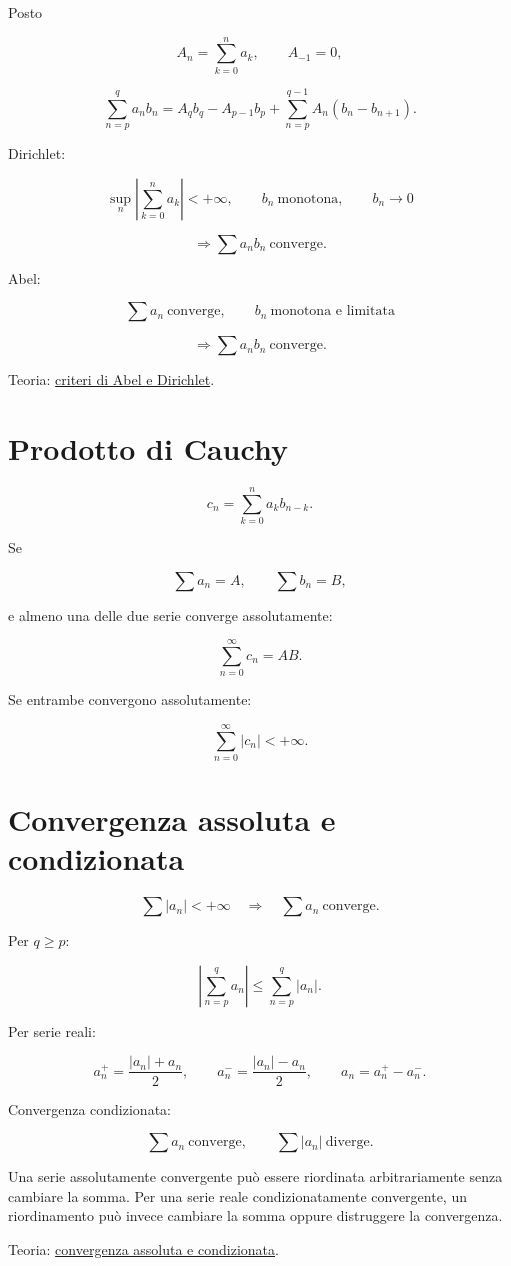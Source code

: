 Posto

\[
\displaystyle
A_n=\sum_{k=0}^{n}a_k,
\qquad
A_{-1}=0,
\]

\[
\displaystyle
\sum_{n=p}^{q}a_nb_n
=
A_qb_q-A_{p-1}b_p
+
\sum_{n=p}^{q-1}A_n(b_n-b_{n+1}).
\]

Dirichlet:

\[
\displaystyle
\sup_n\left\lvert\sum_{k=0}^{n}a_k\right\rvert<+\infty,
\qquad
b_n\ \text{monotona},
\qquad
b_n\to0
\]

\[
\displaystyle
\Longrightarrow
\sum a_nb_n\ \text{converge}.
\]

Abel:

\[
\displaystyle
\sum a_n\ \text{converge},
\qquad
b_n\ \text{monotona e limitata}
\]

\[
\displaystyle
\Longrightarrow
\sum a_nb_n\ \text{converge}.
\]

Teoria: \href{https://ingegnerismo.it/matematica/criteri-di-abel-e-dirichlet/}{criteri di Abel e Dirichlet}.

\section{Prodotto di Cauchy}\label{prodotto-di-cauchy}

\[
\displaystyle
c_n=\sum_{k=0}^{n}a_kb_{n-k}.
\]

Se

\[
\displaystyle
\sum a_n=A,
\qquad
\sum b_n=B,
\]

e almeno una delle due serie converge assolutamente:

\[
\displaystyle
\sum_{n=0}^{\infty}c_n=AB.
\]

Se entrambe convergono assolutamente:

\[
\displaystyle
\sum_{n=0}^{\infty}\lvert c_n\rvert<+\infty.
\]

\section{Convergenza assoluta e condizionata}\label{convergenza-assoluta-e-condizionata}

\[
\displaystyle
\sum\lvert a_n\rvert<+\infty
\quad\Longrightarrow\quad
\sum a_n\ \text{converge}.
\]

Per \(q\ge p\):

\[
\displaystyle
\left\lvert\sum_{n=p}^{q}a_n\right\rvert
\le
\sum_{n=p}^{q}\lvert a_n\rvert.
\]

Per serie reali:

\[
\displaystyle
a_n^+=\frac{\lvert a_n\rvert+a_n}{2},
\qquad
a_n^-=\frac{\lvert a_n\rvert-a_n}{2},
\qquad
a_n=a_n^+-a_n^-.
\]

Convergenza condizionata:

\[
\displaystyle
\sum a_n\ \text{converge},
\qquad
\sum\lvert a_n\rvert\ \text{diverge}.
\]

Una serie assolutamente convergente può essere riordinata arbitrariamente senza cambiare la somma. Per una serie reale condizionatamente convergente, un riordinamento può invece cambiare la somma oppure distruggere la convergenza.

Teoria: \href{https://ingegnerismo.it/matematica/convergenza-assoluta/}{convergenza assoluta e condizionata}.
